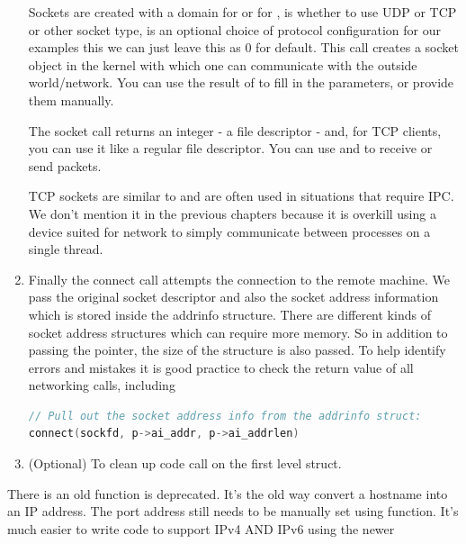 \begin{enumerate}
Sockets are created with a domain  for  or  for ,  is whether to use UDP or TCP or other socket type,  is an optional choice of protocol configuration for our examples this we can just leave this as 0 for default.
This call creates a socket object in the kernel with which one can communicate with the outside world/network.
You can use the result of  to fill in the  parameters, or provide them manually.

The socket call returns an integer - a file descriptor - and, for TCP clients, you can use it like a regular file descriptor.
You can use  and  to receive or send packets.

TCP sockets are similar to  and are often used in situations that require IPC.
We don't mention it in the previous chapters because it is overkill using a device suited for network to simply communicate between processes on a single thread.

\item {}

Finally the connect call attempts the connection to the remote machine.
We pass the original socket descriptor and also the socket address information which is stored inside the addrinfo structure.
There are different kinds of socket address structures which can require more memory.
So in addition to passing the pointer, the size of the structure is also passed.
To help identify errors and mistakes it is good practice to check the return value of all networking calls, including 


\begin{lstlisting}[language=C]
// Pull out the socket address info from the addrinfo struct:
connect(sockfd, p->ai_addr, p->ai_addrlen)
\end{lstlisting}

\item (Optional) To clean up code call  on the first level  struct.
\end{enumerate}

There is an old function  is deprecated.
It's the old way convert a hostname into an IP address.
The port address still needs to be manually set using  function.
It's much easier to write code to support IPv4 AND IPv6 using the newer 

